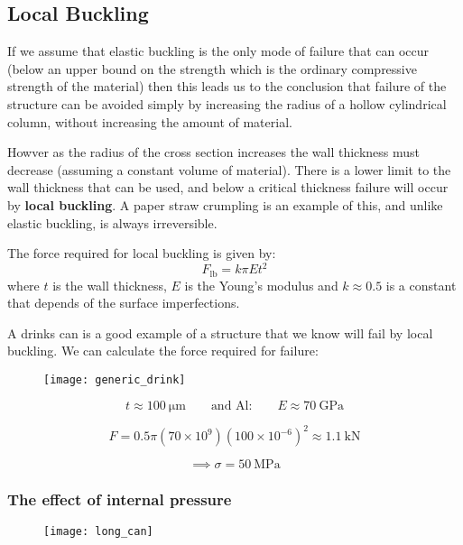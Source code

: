 \subsection{Local Buckling}

If we assume that elastic buckling is the only mode of failure that can occur (below an upper bound on the strength which is the ordinary compressive strength of the material) then this leads us to the conclusion that failure of the structure can be avoided simply by increasing the radius of a hollow cylindrical column, without increasing the amount of material.

Howver as the radius of the cross section increases the wall thickness must decrease (assuming a constant volume of material). There is a lower limit to the wall thickness that can be used, and below a critical thickness failure will occur by {\bf local buckling}. A paper straw crumpling is an example of this, and unlike elastic buckling, is always irreversible.

The force required for local buckling is given by:
\begin{equation}
    F_{\text{lb}} = k\pi E t^2
\end{equation}
where $t$ is the wall thickness, $E$ is the Young's modulus and $k \approx 0.5$ is a constant that depends of the surface imperfections. 

A drinks can is a good example of a structure that we know will fail by local buckling. We can calculate the force required for failure:

\begin{annotation}
\begin{figure}[t!]
    \centering
    \texttt{[image: generic\_drink]}
\end{figure}
\FloatBarrier

$$
t \approx \SI{100}{\micro\meter} \qquad \text{and Al:} \qquad E \approx \SI{70}{\giga\pascal}
$$

$$ F = 0.5  \pi ( 70\times 10^9 )(100\times 10^{-6})^2\approx \SI{1.1}{\kilo\newton} $$

$$\implies \sigma = \SI{50}{\mega\pascal}$$
\end{annotation}

\subsubsection{The effect of internal pressure}

\FloatBarrier
\begin{figure}[h!]
    \centering
    \texttt{[image: long\_can]}
\end{figure}
\FloatBarrier




